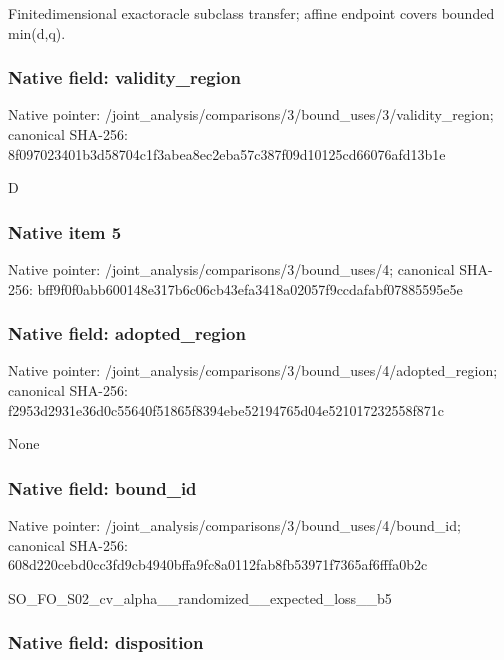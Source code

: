 \documentclass[10pt,a4paper]{article}
\begin{document}
Finitedimensional exactoracle subclass transfer; affine endpoint covers bounded min(d,q).


\subsubsection{Native field: validity\_region}


Native pointer: /joint\_analysis/comparis\allowbreak{}ons/3/bound\_uses/3/valid\allowbreak{}ity\_region; canonical SHA-256: 8f097023401b3d58704c1f3a\allowbreak{}bea8ec2eba57c387f09d1012\allowbreak{}5cd66076afd13b1e


D


\subsubsection{Native item 5}


Native pointer: /joint\_analysis/comparis\allowbreak{}ons/3/bound\_uses/4; canonical SHA-256: bff9f0f0abb600148e317b6c\allowbreak{}06cb43efa3418a02057f9ccd\allowbreak{}afabf07885595e5e



\subsubsection{Native field: adopted\_region}


Native pointer: /joint\_analysis/comparis\allowbreak{}ons/3/bound\_uses/4/adopt\allowbreak{}ed\_region; canonical SHA-256: f2953d2931e36d0c55640f51\allowbreak{}865f8394ebe52194765d04e5\allowbreak{}21017232558f871c


None


\subsubsection{Native field: bound\_id}


Native pointer: /joint\_analysis/comparis\allowbreak{}ons/3/bound\_uses/4/bound\allowbreak{}\_id; canonical SHA-256: 608d220cebd0cc3fd9cb4940\allowbreak{}bffa9fc8a0112fab8fb53971\allowbreak{}f7365af6fffa0b2c


SO\_FO\_S02\_cv\_alpha\_\_rand\allowbreak{}omized\_\_expected\_loss\_\_b\allowbreak{}5


\subsubsection{Native field: disposition}
\end{document}
